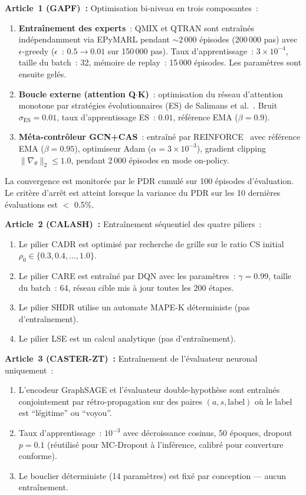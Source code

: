 \textbf{Article~1 (GAPF)~:} Optimisation bi-niveau en trois composantes~:
\begin{enumerate}
    \item \textbf{Entraînement des experts}~: QMIX et QTRAN sont entraînés indépendamment via EPyMARL pendant ${\sim}2\,000$ épisodes (200\,000 pas) avec $\epsilon$-greedy ($\epsilon$~: $0.5 \to 0.01$ sur 150\,000 pas). Taux d'apprentissage~: $3 \times 10^{-4}$, taille du batch~: 32, mémoire de replay~: 15\,000 épisodes. Les paramètres sont ensuite gelés.
    \item \textbf{Boucle externe (attention Q$\cdot$K)}~: optimisation du réseau d'attention monotone par stratégies évolutionnaires (ES) de Salimans et al.\ \cite{salimans2017evolution}. Bruit $\sigma_{\text{ES}} = 0.01$, taux d'apprentissage ES~: $0.01$, référence EMA ($\beta = 0.9$).
    \item \textbf{Méta-contrôleur GCN+CAS}~: entraîné par REINFORCE~\cite{williams1992simple} avec référence EMA ($\beta = 0.95$), optimiseur Adam ($\alpha = 3 \times 10^{-3}$), gradient clipping $\|\nabla_\theta\|_2 \leq 1.0$, pendant 2\,000 épisodes en mode on-policy.
\end{enumerate}
La convergence est monitorée par le PDR cumulé sur 100 épisodes d'évaluation. Le critère d'arrêt est atteint lorsque la variance du PDR sur les 10 dernières évaluations est $<$ 0.5\%.

\textbf{Article~2 (CALASH)~:} Entraînement séquentiel des quatre piliers~:
\begin{enumerate}
    \item Le pilier CADR est optimisé par recherche de grille sur le ratio CS initial $\rho_0 \in \{0.3, 0.4, \ldots, 1.0\}$.
    \item Le pilier CARE est entraîné par DQN avec les paramètres~: $\gamma = 0.99$, taille du batch~: 64, réseau cible mis à jour toutes les 200 étapes.
    \item Le pilier SHDR utilise un automate MAPE-K déterministe (pas d'entraînement).
    \item Le pilier LSE est un calcul analytique (pas d'entraînement).
\end{enumerate}

\textbf{Article~3 (CASTER-ZT)~:} Entraînement de l'évaluateur neuronal uniquement~:
\begin{enumerate}
    \item L'encodeur GraphSAGE et l'évaluateur double-hypothèse sont entraînés conjointement par rétro-propagation sur des paires $(a, s, \text{label})$ où le label est ``légitime'' ou ``voyou''.
    \item Taux d'apprentissage~: $10^{-3}$ avec décroissance cosinus, 50 époques, dropout $p = 0.1$ (réutilisé pour MC-Dropout à l'inférence, calibré pour couverture conforme).
    \item Le bouclier déterministe (14 paramètres) est fixé par conception --- aucun entraînement.
\end{enumerate}

